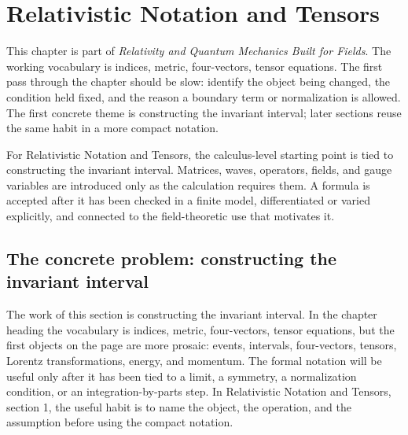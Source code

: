 \chapter{Relativistic Notation and Tensors}


This chapter is part of \emph{Relativity and Quantum Mechanics Built for Fields}.  The working vocabulary is indices, metric, four-vectors, tensor equations.  The first pass through the chapter should be slow: identify the object being changed, the condition held fixed, and the reason a boundary term or normalization is allowed.  The first concrete theme is constructing the invariant interval; later sections reuse the same habit in a more compact notation.

For Relativistic Notation and Tensors, the calculus-level starting point is tied to constructing the invariant interval.  Matrices, waves, operators, fields, and gauge variables are introduced only as the calculation requires them.  A formula is accepted after it has been checked in a finite model, differentiated or varied explicitly, and connected to the field-theoretic use that motivates it.

\section{The concrete problem: constructing the invariant interval}













The work of this section is constructing the invariant interval.  In the chapter heading the vocabulary is indices, metric, four-vectors, tensor equations, but the first objects on the page are more prosaic: events, intervals, four-vectors, tensors, Lorentz transformations, energy, and momentum.  The formal notation will be useful only after it has been tied to a limit, a symmetry, a normalization condition, or an integration-by-parts step.  In Relativistic Notation and Tensors, section 1, the useful habit is to name the object, the operation, and the assumption before using the compact notation.

